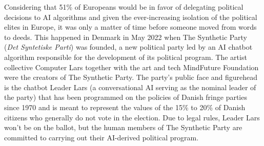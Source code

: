 Considering that 51\% of Europeans would be in favor of delegating political decisions to AI algorithms and given the ever-increasing isolation of the political elites in Europe, it was only a matter of time before someone moved from words to deeds. This happened in Denmark in May 2022 when The Synthetic Party (\textit{Det Syntetiske Parti}) was founded, a new political party led by an AI chatbot algorithm responsible for the development of its political program. The artist collective Computer Lars together with the art and tech MindFuture Foundation were the creators of The Synthetic Party. The party's public face and figurehead is the chatbot Leader Lars (a conversational AI serving as the nominal leader of the party) that has been programmed on the policies of Danish fringe parties since 1970 and is meant to represent the values of the 15\% to 20\% of Danish citizens who generally do not vote in the election. Due to legal rules, Leader Lars won't be on the ballot, but the human members of The Synthetic Party are committed to carrying out their AI-derived political program.

